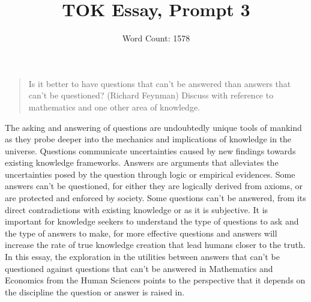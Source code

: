 \documentclass[a4paper,12pt]{article}
\title{\vspace{-8ex}TOK Essay, Prompt 3}
\author{Word Count: 1578}
\date{}
\begin{document}
\maketitle
\begin{quote}
    Is it better to have questions that can't be answered than answers that can't be questioned? (Richard Feynman) Discuss with reference to mathematics and one other area of knowledge.
\end{quote}

The asking and answering of questions are undoubtedly unique tools of mankind as they probe deeper into the mechanics and implications of knowledge in the universe. Questions communicate uncertainties caused by new findings towards existing knowledge frameworks. Answers are arguments that alleviates the uncertainties posed by the question through logic or empirical evidences. Some answers can’t be questioned, for either they are logically derived from axioms, or are protected and enforced by society. Some questions can’t be answered, from its direct contradictions with existing knowledge or as it is subjective. It is important for knowledge seekers to understand the type of questions to ask and the type of answers to make, for more effective questions and answers will increase the rate of true knowledge creation that lead humans closer to the truth. In this essay, the exploration in the utilities between answers that can't be questioned against questions that can't be answered in Mathematics and Economics from the Human Sciences points to the perspective that it depends on the discipline the question or answer is raised in.


\end{document}
